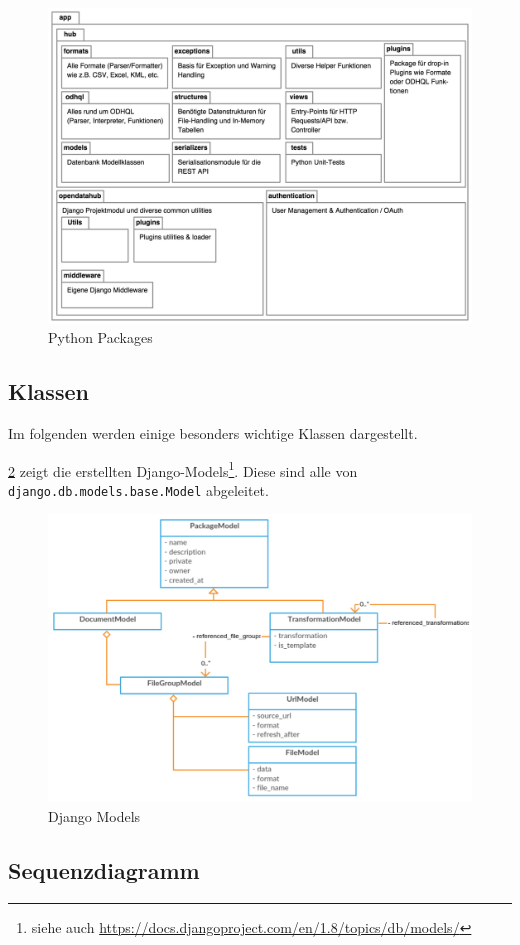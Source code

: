 \begin{figure}[H]
    \centering
    \includegraphics[width=\linewidth]{fig/packages}
    \caption{Python Packages}
    \label{fig:pd:pypackages}
\end{figure}

\subsection{Klassen}
Im folgenden werden einige besonders wichtige Klassen dargestellt.

\cref{fig:pd:modelclasses} zeigt die erstellten Django-Models\footnote{siehe auch \url{https://docs.djangoproject.com/en/1.8/topics/db/models/}}. Diese sind alle von \texttt{django.db.models.base.Model} abgeleitet.
\begin{figure}[H]
    \centering
    \includegraphics[width=\linewidth]{fig/model-classes}
    \caption{Django Models}
    \label{fig:pd:modelclasses}
\end{figure}


\subsection{Sequenzdiagramm}
